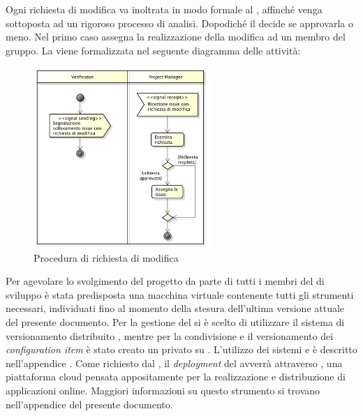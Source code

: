			\label{sec:StrutturaIssue}
				Ogni richiesta di modifica va inoltrata in modo formale al , affinché venga sottoposta ad un rigoroso processo di analisi. Dopodiché il  decide se approvarla o meno. Nel primo caso assegna la realizzazione della modifica ad un membro del gruppo. 
				La  viene formalizzata nel seguente diagramma delle attività:
				\begin{figure}[H]
					\centering
					\includegraphics[width=0.6\textwidth]{NormeDiProgetto/Pics/RichiestaModifica}
					\caption{Procedura di richiesta di modifica}
				\end{figure}
						
			Per agevolare lo svolgimento del progetto da parte di tutti i membri del  di sviluppo è stata predisposta una macchina virtuale contenente tutti gli strumenti  necessari, individuati fino al momento della stesura dell'ultima versione attuale del presente documento.
				Per la gestione del  si è scelto di utilizzare il sistema di versionamento distribuito , mentre per la condivisione e il versionamento dei \textit{configuration item} è stato creato un  privato su .
				L'utilizzo dei sistemi  e  è descritto nell'appendice .
				Come richiesto dal , il \textit{deployment} del  avverrà attraverso , una piattaforma cloud pensata appositamente per la realizzazione e distribuzione di applicazioni online. Maggiori informazioni su questo strumento si trovano nell'appendice  del presente documento.
			
